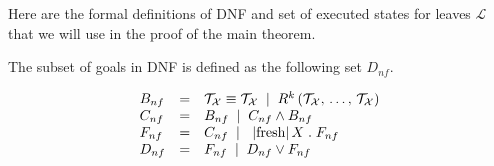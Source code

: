 Here are the formal definitions of DNF and set of executed states for leaves $\mathcal{L}$ that we will use in the proof of the main theorem.

\begin{definition}
The subset of goals in DNF is defined as the following set $D_{nf}$.

\[ \begin{array}{lcl}
B_{nf} & = &  \unigoal{\mathcal{T}_\mathcal{X}}{\mathcal{T}_\mathcal{X}} \; \mid \;
                     \invokegoal{R^k}{\mathcal{T}_\mathcal{X}}{\mathcal{T}_\mathcal{X}} \\
C_{nf} & = & B_{nf} \; \mid \; \conjgoal{C_{nf}}{B_{nf}} \\
F_{nf} & = & C_{nf} \; \mid \; \freshgoal{X}{F_{nf} } \\
D_{nf} & = & F_{nf} \; \mid \; \disjgoal{D_{nf}}{F_{nf}}
\end{array} \]
\end{definition}

